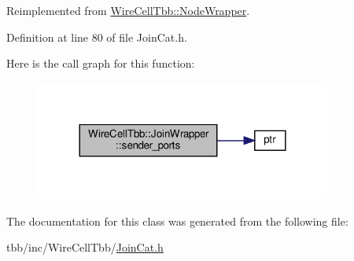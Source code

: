 Reimplemented from \hyperlink{class_wire_cell_tbb_1_1_node_wrapper_a4ed2daeddbb2f75934759ac8f9a3ce8b}{Wire\+Cell\+Tbb\+::\+Node\+Wrapper}.



Definition at line 80 of file Join\+Cat.\+h.

Here is the call graph for this function\+:
\nopagebreak
\begin{figure}[H]
\begin{center}
\leavevmode
\includegraphics[width=276pt]{class_wire_cell_tbb_1_1_join_wrapper_a5f533ec15abe6bbc05b852af154cb9a1_cgraph}
\end{center}
\end{figure}


The documentation for this class was generated from the following file\+:\begin{DoxyCompactItemize}
\item 
tbb/inc/\+Wire\+Cell\+Tbb/\hyperlink{_join_cat_8h}{Join\+Cat.\+h}\end{DoxyCompactItemize}
